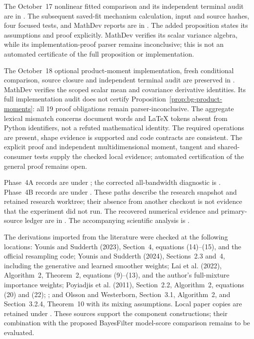 \documentclass[11pt]{article}
\begin{document}
The October~17 nonlinear fitted comparison and its independent terminal
audit are in
.
The subsequent saved-fit mechanism calculation, input and source hashes,
four focused tests, and MathDev reports are in
.
The added proposition states its assumptions and proof explicitly. MathDev
verifies its scalar variance algebra, while its implementation-proof parser
remains inconclusive; this is not an automated certificate of the full
proposition or implementation.

The October~18 optional product-moment implementation, fresh conditional
comparison, source closure and independent terminal audit are preserved in
.
MathDev verifies the scoped scalar mean and covariance derivative identities.
Its full implementation audit does not certify
Proposition~\ref{prop:bg-product-moments}: all 19 proof obligations remain
parser-inconclusive. The aggregate lexical mismatch concerns document words
and LaTeX tokens absent from Python identifiers, not a refuted mathematical
identity. The required operations are present, shape evidence is supported
and code contracts are consistent. The explicit proof and independent
multidimensional moment, tangent and shared-consumer tests supply the checked
local evidence; automated certification of the general proof remains open.

Phase~4A records are under
; the
corrected all-bandwidth diagnostic is
.
Phase~4B records are under
.
These paths describe the research snapshot and retained research worktree;
their absence from another checkout is not evidence that the experiment did
not run. The recovered numerical evidence and primary-source ledger are in
.
The accompanying scientific analysis is
.

The derivations imported from the literature were checked at the following
locations: Younis and Sudderth (2023), Section~4, equations (14)--(15), and
the official resampling code; Younis and Sudderth (2024), Sections~2.3 and~4,
including the generative and learned smoother weights; Lai et al. (2022),
Algorithm~2, Theorem~2, equations (9)--(13), and the author's full-mixture
importance weights; Poyiadjis et al. (2011), Section~2.2, Algorithm~2,
equations (20) and (22); \citet[Section~4.2, equations (24)--(25)]{scibior2021dpf};
and Olsson and Westerborn, Section~3.1, Algorithm~2, and Section~3.2.4,
Theorem~10 with its mixing assumptions. Local paper copies are retained under
. These sources support the component
constructions; their combination with the proposed BayesFilter model-score
comparison remains to be evaluated.
\end{document}
